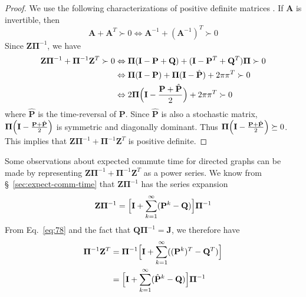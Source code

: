 \begin{proof}
  We use the
  following characterizations of positive definite matrices
  \citep[see][\S
  1.2]{boley09:_gener_laplac,horn94:_topic_in_matrix_analy}. If
  $\mathbf{A}$ is invertible, then
  \begin{equation}
    \label{eq:74}
    \mathbf{A} + \mathbf{A}^{T} \succ 0 \Leftrightarrow
    \mathbf{A}^{-1} + (\mathbf{A}^{-1})^{T} \succ 0
  \end{equation}
  Since $\mathbf{Z}\bm{\Pi}^{-1}$, we have
  \begin{equation}
    \label{eq:75}
    \begin{split}
   \mathbf{Z}\bm{\Pi}^{-1} + \bm{\Pi}^{-1}\mathbf{Z}^{T} \succ 0
   & \Leftrightarrow \bm{\Pi}(\mathbf{I} - \mathbf{P} + \mathbf{Q}) +
   (\mathbf{I} - \mathbf{P}^{T} + \mathbf{Q}^{T}) \bm{\Pi} \succ 0  \\
   & \Leftrightarrow \bm{\Pi}(\mathbf{I} - \mathbf{P}) +
   \bm{\Pi}(\mathbf{I} - \hat{\mathbf{P}}) + 2 \pi \pi^{T} \succ 0 \\
   & \Leftrightarrow 2 \bm{\Pi}\Bigl(\mathbf{I} - \frac{\mathbf{P} +
     \hat{\mathbf{P}}}{2}\Bigr) + 2\pi\pi^{T} \succ 0
   \end{split}
  \end{equation}
  where $\hat{\mathbf{P}}$ is the time-reversal of $\mathbf{P}$. Since
  $\hat{\mathbf{P}}$ is also a stochastic matrix,
  $\bm{\Pi}\Bigl(\mathbf{I} - \tfrac{\mathbf{P} +
    \hat{\mathbf{P}}}{2}\Bigr)$ is symmetric and diagonally dominant. Thus
  $\bm{\Pi}\Bigl(\mathbf{I} - \tfrac{\mathbf{P} +
    \hat{\mathbf{P}}}{2}\Bigr) \succeq 0$. This implies that
  $\mathbf{Z}\bm{\Pi}^{-1} + \bm{\Pi}^{-1}\mathbf{Z}^{T}$ is positive
  definite. 
\end{proof}
Some observations about expected commute time for directed graphs can
be made by representing $\mathbf{Z}\bm{\Pi}^{-1} +
\bm{\Pi}^{-1}\mathbf{Z}^{T}$ as a power series. We know from \S~\ref{sec:expect-comm-time} that $\mathbf{Z}\bm{\Pi}^{-1}$ has the
series expansion
\begin{equation*}
  \mathbf{Z}\bm{\Pi}^{-1} = \Bigl[ \mathbf{I} +
  \sum_{k=1}^{\infty}(\mathbf{P}^{k} - \mathbf{Q})\Bigr] \bm{\Pi}^{-1}
\end{equation*}
From Eq.~\eqref{eq:78} and the fact that $\mathbf{Q}\bm{\Pi}^{-1} =
\mathbf{J}$, we therefore have 
\begin{equation*}
  \begin{split}
\bm{\Pi}^{-1} \mathbf{Z}^{T} &= \bm{\Pi}^{-1} \Bigl[ \mathbf{I} +
  \sum_{k=1}^{\infty}((\mathbf{P}^{k})^{T} - \mathbf{Q}^{T})\Bigr] \\
  &= \Bigl[ \mathbf{I} +
  \sum_{k=1}^{\infty}(\hat{\mathbf{P}}^{k} - \mathbf{Q})\Bigr]
  \bm{\Pi}^{-1}
  \end{split}
\end{equation*}
